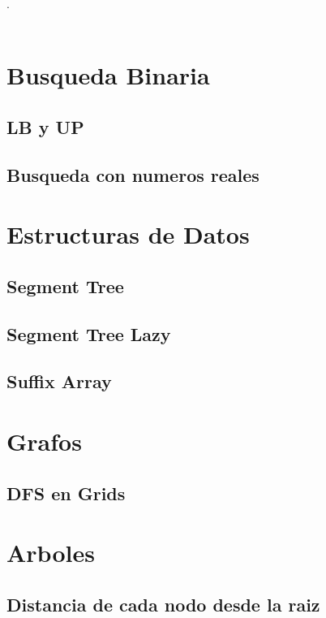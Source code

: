

\def\title{Competitive Programing Reference}
.\\[0.2cm]
 \\[0.5cm]
\tableofcontents\newpage

\section{Busqueda Binaria}
	\subsection{LB y UP}
	\subsection{Busqueda con numeros reales}

\section{Estructuras de Datos}
	\subsection{Segment Tree}
	\subsection{Segment Tree Lazy}
	\subsection{Suffix Array}

\section{Grafos}
	\subsection{DFS en Grids}

\section{Arboles}
	\subsection{Distancia de cada nodo desde la raiz}
